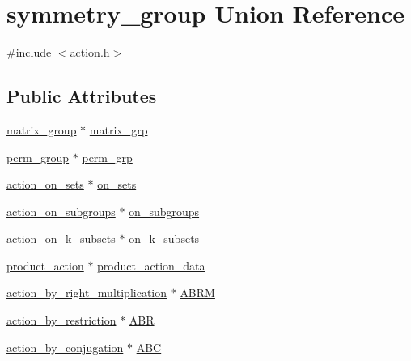 \hypertarget{unionsymmetry__group}{}\section{symmetry\+\_\+group Union Reference}
\label{unionsymmetry__group}


{\ttfamily \#include $<$action.\+h$>$}

\subsection*{Public Attributes}
\begin{DoxyCompactItemize}
\item 
\mbox{\hyperlink{classmatrix__group}{matrix\+\_\+group}} $\ast$ \mbox{\hyperlink{unionsymmetry__group_a53ddf87af86ca2259b6db471a9d11809}{matrix\+\_\+grp}}
\item 
\mbox{\hyperlink{classperm__group}{perm\+\_\+group}} $\ast$ \mbox{\hyperlink{unionsymmetry__group_ada0baa1bfd77663e96d6c64747b76728}{perm\+\_\+grp}}
\item 
\mbox{\hyperlink{classaction__on__sets}{action\+\_\+on\+\_\+sets}} $\ast$ \mbox{\hyperlink{unionsymmetry__group_a694590693f0266184ffb69660aae0216}{on\+\_\+sets}}
\item 
\mbox{\hyperlink{classaction__on__subgroups}{action\+\_\+on\+\_\+subgroups}} $\ast$ \mbox{\hyperlink{unionsymmetry__group_ab0cf14ce800e1334fd883ed0b6337b46}{on\+\_\+subgroups}}
\item 
\mbox{\hyperlink{classaction__on__k__subsets}{action\+\_\+on\+\_\+k\+\_\+subsets}} $\ast$ \mbox{\hyperlink{unionsymmetry__group_afd8738c2c82454c94aa31ee39cf98285}{on\+\_\+k\+\_\+subsets}}
\item 
\mbox{\hyperlink{classproduct__action}{product\+\_\+action}} $\ast$ \mbox{\hyperlink{unionsymmetry__group_afea7c35f1a4a6c651e79cc803f28470b}{product\+\_\+action\+\_\+data}}
\item 
\mbox{\hyperlink{classaction__by__right__multiplication}{action\+\_\+by\+\_\+right\+\_\+multiplication}} $\ast$ \mbox{\hyperlink{unionsymmetry__group_ab873c5aa9ffc4dab6c542473841c71d3}{A\+B\+RM}}
\item 
\mbox{\hyperlink{classaction__by__restriction}{action\+\_\+by\+\_\+restriction}} $\ast$ \mbox{\hyperlink{unionsymmetry__group_a4b89b4123c703bda2164913dc8bd43ec}{A\+BR}}
\item 
\mbox{\hyperlink{classaction__by__conjugation}{action\+\_\+by\+\_\+conjugation}} $\ast$ \mbox{\hyperlink{unionsymmetry__group_a17f8687b4d15bc7c7ac0084648866306}{A\+BC}}

\end{DoxyCompactItemize}
